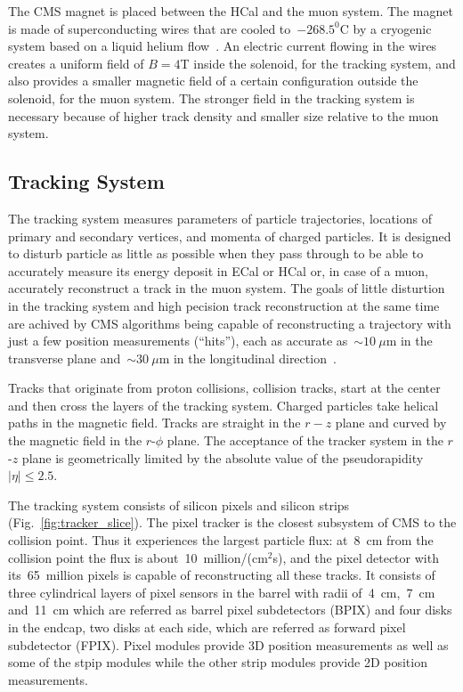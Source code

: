 The CMS magnet is placed between the HCal and the muon system. The magnet is made of superconducting wires that are cooled to~$-268.5^0$C by a cryogenic system based on a liquid helium flow~\cite{ref_MagnetCryo}. An electric current flowing in the wires creates a uniform field of $B=4$T inside the solenoid, for the tracking system, and also provides a smaller magnetic field of a certain configuration outside the solenoid, for the muon system. The stronger field in the tracking system is necessary because of higher track density and smaller size relative to the muon system.

\subsection{Tracking System}

The tracking system measures parameters of particle trajectories, locations of primary and secondary vertices, and momenta of charged particles. It is designed to disturb particle as little as possible when they pass through to be able to accurately measure its energy deposit in ECal or HCal or, in case of a muon, accurately reconstruct a track in the muon system. The goals of little disturtion in the tracking system and high pecision track reconstruction at the same time are achived by CMS algorithms being capable of reconstructing a trajectory with just a few position measurements (``hits''), each as accurate as~$\sim10~\mu$m in the transverse plane and~$\sim30~\mu$m in the longitudinal direction~\cite{ref_trackerPerformance}.

Tracks that originate from proton collisions, collision tracks, start at the center and then cross the layers of the tracking system. Charged particles take helical paths in the magnetic field. Tracks are straight in the $r-z$ plane and curved by the magnetic field in the $r$-$\phi$ plane. The acceptance of the tracker system in the $r$-$z$ plane is geometrically limited by the absolute value of the pseudorapidity $|\eta| \leq 2.5$.

The tracking system consists of silicon pixels and silicon strips (Fig.~\ref{fig:tracker_slice}). The pixel tracker is the closest subsystem of CMS to the collision point. Thus it experiences the largest particle flux: at~8~cm from the collision point the flux is about~10~million/(cm$^2$s), and the pixel detector with its~65~million pixels is capable of reconstructing all these tracks. It consists of three cylindrical layers of pixel sensors in the barrel with radii of~4~cm,~7~cm and~11~cm which are referred as barrel pixel subdetectors (BPIX) and four disks in the endcap, two disks at each side, which are referred as forward pixel subdetector (FPIX). Pixel modules provide 3D position measurements as well as some of the stpip modules while the other strip modules provide 2D position measurements.

